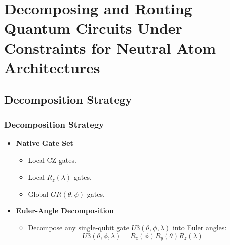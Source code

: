 \documentclass[18 pt]{beamer}
\begin{document}
\section{Decomposing and Routing Quantum Circuits Under Constraints for Neutral Atom Architectures}


\subsection{Decomposition Strategy}
\begin{frame}
    \frametitle{Decomposition Strategy}
    \begin{itemize}
        \item \textbf{Native Gate Set}
        \begin{itemize}
            \item Local CZ gates.
            \item Local $R_z(\lambda)$ gates.
            \item Global $GR(\theta, \phi)$ gates.
        \end{itemize}
        \item \textbf{Euler-Angle Decomposition}
        \begin{itemize}
            \item Decompose any single-qubit gate $U3(\theta, \phi, \lambda)$ into Euler angles:
            \[
            U3(\theta, \phi, \lambda) = R_z(\phi) R_y(\theta) R_z(\lambda)
            \]
        \end{itemize}
    \end{itemize}
\end{frame}
\end{document}
